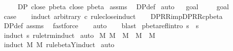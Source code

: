 \begin{isabellebody}
\ \ \ \ \ {\isachardoublequoteopen}DP\ {\isacharparenleft}close\ pbeta{\isacharparenright}\ {\isacharparenleft}close\ pbeta{\isacharparenright}{\isachardoublequoteclose}\isanewline
%
\isadelimproof
%
\endisadelimproof
%
\isatagproof
{}\isamarkupfalse%
\ assms\ \isamarkupfalse%
\ DP{\isacharunderscore}def\isanewline
{}\isamarkupfalse%
\ auto\isanewline
{}\isamarkupfalse%
\ {\isacharminus}\isanewline
{}\isamarkupfalse%
\ goal{}\ \isanewline
\ \ \isamarkupfalse%
\ goal{}{\isacharparenleft}{}{\isacharcomma}{}{\isacharparenright}\ \isamarkupfalse%
\ {\isacharquery}case\isanewline
\ \ \isamarkupfalse%
\ {\isacharparenleft}induct\ arbitrary{\isacharcolon}\ c\ rule{\isacharcolon}close{\isachardot}induct{\isacharparenright}\isanewline
\ \ \isamarkupfalse%
\ DP{\isacharunderscore}R{\isacharunderscore}R{\isacharunderscore}imp{\isacharunderscore}DP{\isacharunderscore}R{\isacharunderscore}Rc{\isacharunderscore}pbeta\ \isamarkupfalse%
\ DP{\isacharunderscore}def\ assms\ \isamarkupfalse%
\ fastforce\isanewline
\ \ \isamarkupfalse%
\ auto\isanewline
\ \ \isamarkupfalse%
\ blast\isanewline
{}\isamarkupfalse%
%
\endisatagproof
{\isafoldproof}%
%
\isadelimproof
\isanewline
%
\endisadelimproof
\isanewline
{}\isamarkupfalse%
\ pbeta{\isacharunderscore}refl{\isacharbrackleft}intro{\isacharbrackright}{\isacharcolon}\ {\isachardoublequoteopen}s\ {\isasymggreater}\ s{\isachardoublequoteclose}\isanewline
%
\isadelimproof
%
\endisadelimproof
%
\isatagproof
{}\isamarkupfalse%
\ {\isacharparenleft}induct\ s\ rule{\isacharcolon}trm{\isachardot}induct{\isacharparenright}\isanewline
{}\isamarkupfalse%
\ auto%
\endisatagproof
{\isafoldproof}%
%
\isadelimproof
\isanewline
%
\endisadelimproof
\isanewline
{}\isamarkupfalse%
\ M{}{\isacharprime}{\isacharcolon}\ {\isachardoublequoteopen}M\ {\isasymRightarrow}\ M{\isacharprime}\ {\isasymLongrightarrow}\ M\ {\isasymggreater}\ M{\isacharprime}{\isachardoublequoteclose}\isanewline
%
\isadelimproof
%
\endisadelimproof
%
\isatagproof
{}\isamarkupfalse%
\ {\isacharparenleft}induct\ M\ M{\isacharprime}\ rule{\isacharcolon}beta{\isacharunderscore}Y{\isachardot}induct{\isacharparenright}\isanewline
{}\isamarkupfalse%
\ auto%
\endisatagproof
{\isafoldproof}%

\end{isabellebody}
